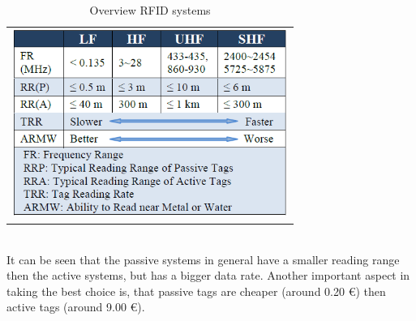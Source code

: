 \begin{table}[!htbp]
\centering
\begin{tabular}{c}
\includegraphics[width = 9cm]{Pictures/RFID_Systems}
\end{tabular}
\caption[Overview RFID systems]{Overview RFID systems \footnotemark[3]}
\label{RFID_Systems}
\end{table}\\
It can be seen that the passive systems in general have a smaller reading range then the active systems, but has a bigger data rate. Another important aspect in taking the best choice is, that passive tags are cheaper (around 0.20 \euro{}) then active tags (around 9.00 \euro{}).

